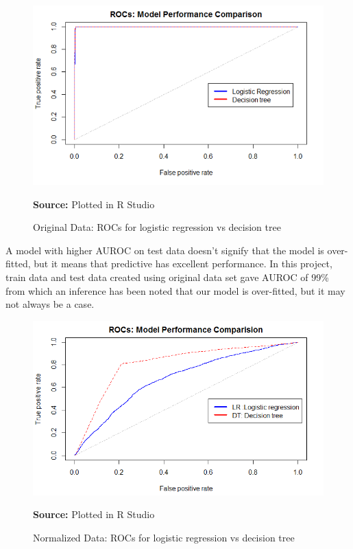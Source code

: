 \begin{center}
\begin{figure}[!htb]
\includegraphics[width=\textwidth]{result0.png}
\centering
\caption{Original Data: ROCs for logistic regression vs decision tree}{\textbf{Source:} Plotted in R Studio}
\label{fig:roc1}
\end{figure}
\end{center}

A model with higher AUROC on test data doesn't signify that the model is over-fitted, but it means that predictive has excellent performance. In this project, train data and test data created using original data set gave AUROC of 99\% from which an inference has been noted that our model is over-fitted, but it may not always be a case.\\

\begin{center}
\begin{figure}[!htb]
\includegraphics[width=\textwidth]{results1.png}
\centering
\caption{Normalized Data: ROCs for logistic regression vs decision tree}{\textbf{Source:} Plotted in R Studio}
\label{fig:roc}
\end{figure}
\end{center}

